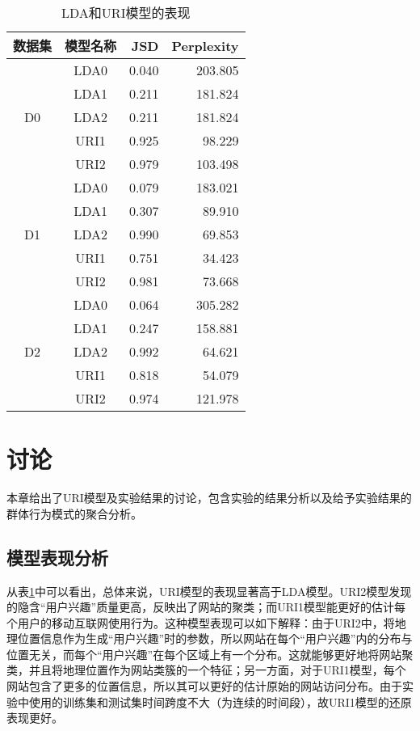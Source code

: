 \begin{table}
\centering
\caption{LDA和URI模型的表现}
\label{interest:tab:res}
\begin{tabular}{|c|c|r|r|} \hline
数据集 & 模型名称 & JSD & Perplexity\\ \hline
\multirow{5}{*}{D0} & LDA0 & 0.040 & 203.805\\ \cline{2-4}
 & LDA1 & 0.211 & 181.824\\ \cline{2-4}
 & LDA2 & 0.211 & 181.824\\ \cline{2-4}
 & URI1 & 0.925 & 98.229\\ \cline{2-4}
 & URI2 & 0.979 & 103.498\\ \cline{2-4}
\hline
\multirow{5}{*}{D1} & LDA0 & 0.079 & 183.021\\ \cline{2-4}
 & LDA1 & 0.307 & 89.910\\ \cline{2-4}
 & LDA2 & 0.990 & 69.853\\ \cline{2-4}
 & URI1 & 0.751 & 34.423\\ \cline{2-4}
 & URI2 & 0.981 & 73.668\\ \cline{2-4}
\hline
\multirow{5}{*}{D2} & LDA0 & 0.064 & 305.282\\ \cline{2-4}
 & LDA1 & 0.247 & 158.881\\ \cline{2-4}
& LDA2 & 0.992 & 64.621\\ \cline{2-4}
 & URI1 & 0.818 & 54.079\\ \cline{2-4}
& URI2 & 0.974 & 121.978\\ \cline{2-4}
\hline\end{tabular}
\end{table}


\section{讨论}
\label{interest:sec:discussion}
本章给出了URI模型及实验结果的讨论，包含实验的结果分析以及给予实验结果的群体行为模式的聚合分析。

\subsection{模型表现分析}
从表\ref{interest:tab:res}中可以看出，总体来说，URI模型的表现显著高于LDA模型。URI2模型发现的隐含``用户兴趣''质量更高，反映出了网站的聚类；而URI1模型能更好的估计每个用户的移动互联网使用行为。这种模型表现可以如下解释：由于URI2中，将地理位置信息作为生成``用户兴趣''时的参数，所以网站在每个``用户兴趣''内的分布与位置无关，而每个``用户兴趣''在每个区域上有一个分布。这就能够更好地将网站聚类，并且将地理位置作为网站类簇的一个特征；另一方面，对于URI1模型，每个网站包含了更多的位置信息，所以其可以更好的估计原始的网站访问分布。由于实验中使用的训练集和测试集时间跨度不大（为连续的时间段），故URI1模型的还原表现更好。

